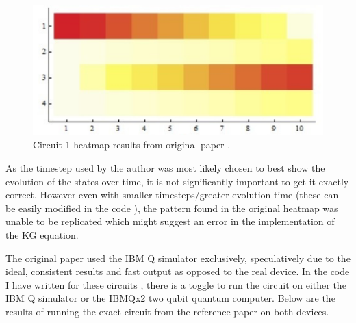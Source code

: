 \documentclass{article}
\begin{document}
\begin{figure}[!htb]
\includegraphics[scale=0.35]{../images/org_circ1}
  \centering
  \caption{Circuit 1 heatmap results from original paper \cite{manik}.}
\end{figure}

As the timestep used by the author was most likely chosen to best show the evolution of the states over time, it is not significantly important to get it exactly correct. However even with smaller timesteps/greater evolution time (these can be easily modified in the code \cite{ipynb}), the pattern found in the original heatmap was unable to be replicated which might suggest an error in the implementation of the KG equation.

The original paper used the IBM Q simulator exclusively, speculatively due to the ideal, consistent results and fast output as opposed to the real device. In the code I have written for these circuits \cite{ipynb}, there is a toggle to run the circuit on either the IBM Q simulator or the IBMQx2 two qubit quantum computer. Below are the results of running the exact circuit from the reference paper on both devices. 
\end{document}

